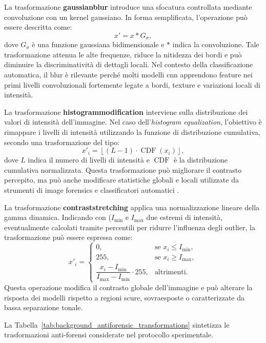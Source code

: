 La trasformazione \textbf{\gls{gaussianblur}} introduce una sfocatura controllata
mediante convoluzione con un kernel gaussiano. In forma semplificata, l'operazione
può essere descritta come:
\[
x' = x * G_{\sigma},
\]
dove \(G_{\sigma}\) è una funzione gaussiana bidimensionale e \(*\) indica la
convoluzione. Tale trasformazione attenua le alte frequenze, riduce la nitidezza
dei bordi e può diminuire la discriminatività di dettagli locali. Nel contesto
della classificazione automatica, il blur è rilevante perché molti modelli
\gls{cnn} apprendono feature nei primi livelli convoluzionali fortemente legate
a bordi, texture e variazioni locali di intensità.

La trasformazione \textbf{\gls{histogrammodification}} interviene sulla distribuzione
dei valori di intensità dell'immagine. Nel caso dell'\textit{histogram equalization},
l'obiettivo è rimappare i livelli di intensità utilizzando la funzione di
distribuzione cumulativa, secondo una trasformazione del tipo:
\[
x'_i = \left\lfloor (L-1)\cdot \operatorname{CDF}(x_i) \right\rfloor,
\]
dove \(L\) indica il numero di livelli di intensità e \(\operatorname{CDF}\) è
la distribuzione cumulativa normalizzata. Questa trasformazione può migliorare
il contrasto percepito, ma può anche modificare statistiche globali e locali
utilizzate da strumenti di image forensics e classificatori automatici
\cite{barni2018cf}.

La trasformazione \textbf{\gls{contraststretching}} applica una normalizzazione
lineare della gamma dinamica. Indicando con (\(I_{\min}\) e \(I_{\max}\) due
estremi di intensità, eventualmente calcolati tramite percentili per ridurre
l'influenza degli outlier, la trasformazione può essere espressa come:
\[
x'_i =
\begin{cases}
0, & \text{se } x_i \leq I_{\min}, \\
255, & \text{se } x_i \geq I_{\max}, \\
\dfrac{x_i - I_{\min}}{I_{\max} - I_{\min}} \cdot 255, & \text{altrimenti}.
\end{cases}
\]
Questa operazione modifica il contrasto globale dell'immagine e può alterare la
risposta dei modelli rispetto a regioni scure, sovraesposte o caratterizzate da
bassa separazione tonale.





La Tabella~\ref{tab:background_antiforensic_transformations} sintetizza le
trasformazioni anti-forensi considerate nel protocollo sperimentale.

